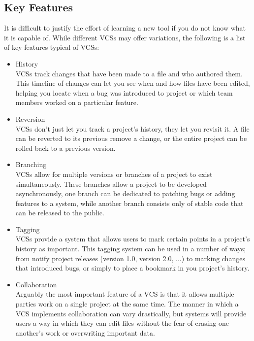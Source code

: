 \documentclass[10pt, a4paper, titlepage]{article}
\begin{document}
\subsection{Key Features}
It is difficult to justify the effort of learning a new tool if you do not
know what it is capable of.
While different VCSs may offer variations, the following is a list of key
features typical of VCSs:
\begin{itemize}
\item History\\
VCSs track changes that have been made to a file and who authored them.
This timeline of changes can let you see when and how files have been edited,
helping you locate when a bug was introduced to project or which team members
worked on a particular feature.
\item Reversion\\
VCSs don't just let you track a project's history, they let you revisit it. 
A file can be reverted to its previous remove a change, or the entire project
can be rolled back to a previous version.
\item Branching\\
VCSs allow for multiple versions or branches of a project to exist
simultaneously. 
These branches allow a project to be developed asynchronously, one branch can
be dedicated to patching bugs or adding features to a system, while another
branch consists only of stable code that can be released to the public.
\item Tagging\\
VCSs provide a system that allows users to mark certain points in a project's
history as important.
This tagging system can be used in a number of ways; from notify project
releases (version 1.0, version 2.0, ...) to marking changes that introduced
bugs, or simply to place a bookmark in you project's history.
\item Collaboration\\
Arguably the most important feature of a VCS is that it allows multiple
parties work on a single project at the same time.
The manner in which a VCS implements collaboration can vary drastically, but
systems will provide users a way in which they can edit files without the
fear of erasing one another's work or overwriting important data.
\end{itemize}
\end{document}
